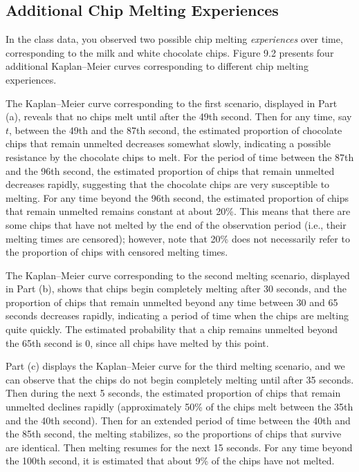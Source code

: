 \documentclass[
]{book}
\begin{document}
\hypertarget{additional-chip-melting-experiences}{%
\subsection*{Additional Chip Melting Experiences}\label{additional-chip-melting-experiences}}

In the class data, you observed two possible chip melting \emph{experiences} over time, corresponding to the milk and white chocolate chips. Figure 9.2 presents four additional Kaplan--Meier curves corresponding to different chip melting experiences.

The Kaplan--Meier curve corresponding to the first scenario, displayed in Part (a), reveals that no chips melt until after the 49th second. Then for any time, say \(t\), between the 49th and the 87th second, the estimated proportion of chocolate chips that remain unmelted decreases somewhat slowly, indicating a possible resistance by the chocolate chips to melt. For the period of time between the 87th and the 96th second, the estimated proportion of chips that remain unmelted decreases rapidly, suggesting that the chocolate chips are very susceptible to melting. For any time beyond the 96th second, the estimated proportion of chips that remain unmelted remains constant at about 20\%. This means that there are some chips that have not melted by the end of the observation period (i.e., their melting times are censored); however, note that 20\% does not necessarily refer to the proportion of chips with censored melting times.

The Kaplan--Meier curve corresponding to the second melting scenario, displayed in Part (b), shows that chips begin completely melting after 30 seconds, and the proportion of chips that remain unmelted beyond any time between 30 and 65 seconds decreases rapidly, indicating a period of time when the chips are melting quite quickly. The estimated probability that a chip remains unmelted beyond the 65th second is 0, since all chips have melted by this point.

Part (c) displays the Kaplan--Meier curve for the third melting scenario, and we can observe that the chips do not begin completely melting until after 35 seconds. Then during the next 5 seconds, the estimated proportion of chips that remain unmelted declines rapidly (approximately 50\% of the chips melt between the 35th and the 40th second). Then for an extended period of time between the 40th and the 85th second, the melting stabilizes, so the proportions of chips that survive are identical. Then melting resumes for the next 15 seconds. For any time beyond the 100th second, it is estimated that about 9\% of the chips have not melted.
\end{document}
